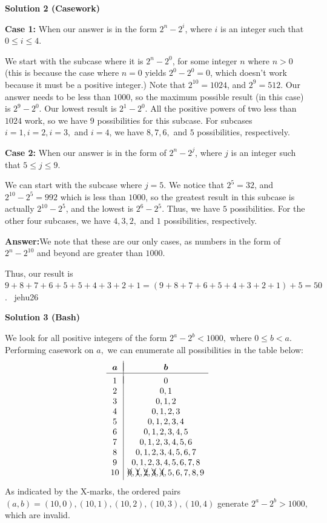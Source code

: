 \begin{enumerate}
 



\textbf{Solution 2 (Casework)}

\textbf{Case 1:} When our answer is in the form $2^n-2^i$, where $i$ is an integer such that $0\le i\le 4$. 

 We start with the subcase where it is $2^n-2^0$, for some integer $n$ where $n>0$ (this is because the case where $n=0$ yields $2^0-2^0=0$, which doesn't work because it must be a positive integer.) Note that $2^{10}=1024$, and $2^9=512$. Our answer needs to be less than $1000$, so the maximum possible result (in this case) is $2^9-2^0$. Our lowest result is $2^1-2^0$. All the positive powers of two less than $1024$ work, so we have $9$ possibilities for this subcase. For subcases $i=1, i=2, i=3,$ and $i=4$, we have $8, 7, 6,$ and $5$ possibilities, respectively.

 \textbf{Case 2:} When our answer is in the form of $2^n-2^j$, where $j$ is an integer such that $5\le j\le 9$.

 We can start with the subcase where $j=5$. We notice that $2^5=32$, and $2^{10}-2^5=992$ which is less than $1000$, so the greatest result in this subcase is actually $2^{10}-2^5$, and the lowest is $2^6-2^5$. Thus, we have $5$ possibilities. For the other four subcases, we have $4, 3, 2,$ and $1$ possibilities, respectively.

 \textbf{Answer:}We note that these are our only cases, as numbers in the form of $2^n-2^{10}$ and beyond are greater than $1000$. 

 Thus, our result is $9+8+7+6+5+5+4+3+2+1=(9+8+7+6+5+4+3+2+1)+5=\boxed{50}$. ~jehu26

 



\textbf{Solution 3 (Bash)}

We look for all positive integers of the form $2^a-2^b<1000,$ where $0\leq b<a.$ Performing casework on $a,$ we can enumerate all possibilities in the table below:
 \[\begin{array}{c|c} & \\ [-2.25ex] \boldsymbol{a} & \boldsymbol{b} \\  \hline  & \\ [-2ex] 1 & 0 \\   2 & 0,1 \\ 3 & 0,1,2 \\ 4 & 0,1,2,3 \\ 5 & 0,1,2,3,4 \\ 6 & 0,1,2,3,4,5 \\ 7 & 0,1,2,3,4,5,6 \\ 8 & 0,1,2,3,4,5,6,7 \\ 9 & 0,1,2,3,4,5,6,7,8 \\ 10 & \xcancel{0},\xcancel{1},\xcancel{2},\xcancel{3},\xcancel{4},5,6,7,8,9 \\ [0.5ex] \end{array}\]As indicated by the X-marks, the ordered pairs $(a,b)=(10,0),(10,1),(10,2),(10,3),(10,4)$ generate $2^a-2^b>1000,$ which are invalid.


\end{enumerate}
